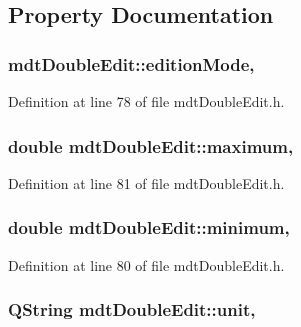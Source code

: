 \subsection{Property Documentation}
\hypertarget{classmdt_double_edit_a07e017947a40b9f0eb423c1122ba9646}{
\subsubsection[{edition\-Mode}]{ mdt\-Double\-Edit\-::edition\-Mode\hspace{0.3cm}{\ttfamily [read]}, {\ttfamily [write]}}}\label{classmdt_double_edit_a07e017947a40b9f0eb423c1122ba9646}


Definition at line 78 of file mdt\-Double\-Edit.\-h.

\hypertarget{classmdt_double_edit_a80edcc2b96d1111f608037f058596c02}{
\subsubsection[{maximum}]{\setlength{\rightskip}{0pt plus 5cm}double mdt\-Double\-Edit\-::maximum\hspace{0.3cm}{\ttfamily [read]}, {\ttfamily [write]}}}\label{classmdt_double_edit_a80edcc2b96d1111f608037f058596c02}


Definition at line 81 of file mdt\-Double\-Edit.\-h.

\hypertarget{classmdt_double_edit_adc63b2b7f47fac62e44673d51444776e}{
\subsubsection[{minimum}]{\setlength{\rightskip}{0pt plus 5cm}double mdt\-Double\-Edit\-::minimum\hspace{0.3cm}{\ttfamily [read]}, {\ttfamily [write]}}}\label{classmdt_double_edit_adc63b2b7f47fac62e44673d51444776e}


Definition at line 80 of file mdt\-Double\-Edit.\-h.

\hypertarget{classmdt_double_edit_a163c58477dc88637f999f56714df74ee}{
\subsubsection[{unit}]{\setlength{\rightskip}{0pt plus 5cm}Q\-String mdt\-Double\-Edit\-::unit\hspace{0.3cm}{\ttfamily [read]}, {\ttfamily [write]}}}\label{classmdt_double_edit_a163c58477dc88637f999f56714df74ee}


